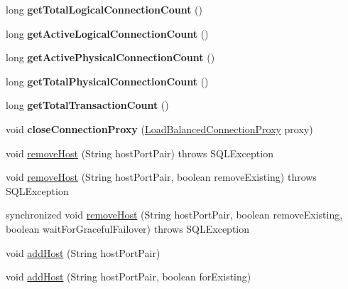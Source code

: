 \begin{DoxyCompactItemize}
long {\bfseries get\+Total\+Logical\+Connection\+Count} ()
\item 
\mbox{\label{classcom_1_1mysql_1_1cj_1_1jdbc_1_1_connection_group_a6c1b7d93c51de858b6d4077b8c713623}} 
long {\bfseries get\+Active\+Logical\+Connection\+Count} ()
\item 
\mbox{\label{classcom_1_1mysql_1_1cj_1_1jdbc_1_1_connection_group_aac9a017ad36cd01dbd3dbcb0f69ee84d}} 
long {\bfseries get\+Active\+Physical\+Connection\+Count} ()
\item 
\mbox{\label{classcom_1_1mysql_1_1cj_1_1jdbc_1_1_connection_group_a86aa431aec7b581a40ea1a05fa3be09b}} 
long {\bfseries get\+Total\+Physical\+Connection\+Count} ()
\item 
\mbox{\label{classcom_1_1mysql_1_1cj_1_1jdbc_1_1_connection_group_a05bf7e733b51d9a6d8bb300c96f547db}} 
long {\bfseries get\+Total\+Transaction\+Count} ()
\item 
\mbox{\label{classcom_1_1mysql_1_1cj_1_1jdbc_1_1_connection_group_ad892402b4f3b73a6677ba6997f493bf6}} 
void {\bfseries close\+Connection\+Proxy} (\mbox{\hyperlink{classcom_1_1mysql_1_1cj_1_1jdbc_1_1ha_1_1_load_balanced_connection_proxy}{Load\+Balanced\+Connection\+Proxy}} proxy)
\item 
void \mbox{\hyperlink{classcom_1_1mysql_1_1cj_1_1jdbc_1_1_connection_group_a688ad628516ef76db003381b4180c175}{remove\+Host}} (String host\+Port\+Pair)  throws S\+Q\+L\+Exception 
\item 
void \mbox{\hyperlink{classcom_1_1mysql_1_1cj_1_1jdbc_1_1_connection_group_a129dcc7b87611dee38ad5f28ec59d1af}{remove\+Host}} (String host\+Port\+Pair, boolean remove\+Existing)  throws S\+Q\+L\+Exception 
\item 
synchronized void \mbox{\hyperlink{classcom_1_1mysql_1_1cj_1_1jdbc_1_1_connection_group_a2bfa53ec828966ecf49573250c11a4ca}{remove\+Host}} (String host\+Port\+Pair, boolean remove\+Existing, boolean wait\+For\+Graceful\+Failover)  throws S\+Q\+L\+Exception 
\item 
void \mbox{\hyperlink{classcom_1_1mysql_1_1cj_1_1jdbc_1_1_connection_group_a609c2dca88c1298e0bc1ec8cf019cfc6}{add\+Host}} (String host\+Port\+Pair)
\item 
void \mbox{\hyperlink{classcom_1_1mysql_1_1cj_1_1jdbc_1_1_connection_group_a6476527606a8bbf591d41745c3ab32ea}{add\+Host}} (String host\+Port\+Pair, boolean for\+Existing)
\end{DoxyCompactItemize}


